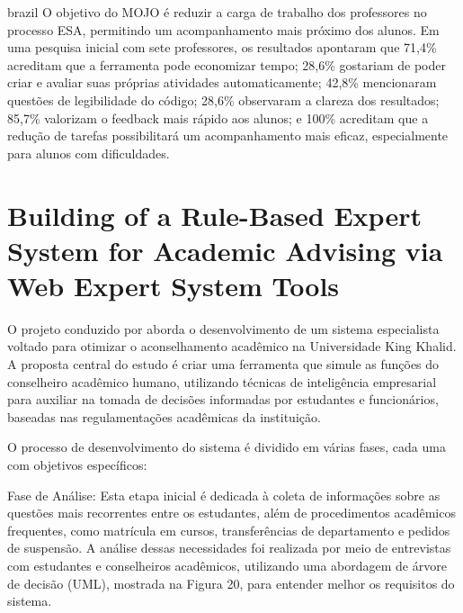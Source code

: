 \begin{otherlanguage*}{brazil}
O objetivo do MOJO é reduzir a carga de trabalho dos professores no processo ESA, permitindo um acompanhamento mais próximo dos alunos. Em uma pesquisa inicial com sete professores, os resultados apontaram que 71,4\% acreditam que a ferramenta pode economizar tempo; 28,6\% gostariam de poder criar e avaliar suas próprias atividades automaticamente; 42,8\% mencionaram questões de legibilidade do código; 28,6\% observaram a clareza dos resultados; 85,7\% valorizam o feedback mais rápido aos alunos; e 100\% acreditam que a redução de tarefas possibilitará um acompanhamento mais eficaz, especialmente para alunos com dificuldades.


\section{Building of a Rule-Based Expert System for Academic Advising via Web Expert System Tools}

O projeto conduzido por \textcite{osmannasr} aborda o desenvolvimento de um sistema especialista voltado para otimizar o aconselhamento acadêmico na Universidade King Khalid. A proposta central do estudo é criar uma ferramenta que simule as funções do conselheiro acadêmico humano, utilizando técnicas de inteligência empresarial para auxiliar na tomada de decisões informadas por estudantes e funcionários, baseadas nas regulamentações acadêmicas da instituição.

O processo de desenvolvimento do sistema é dividido em várias fases, cada uma com objetivos específicos:

Fase de Análise: Esta etapa inicial é dedicada à coleta de informações sobre as questões mais recorrentes entre os estudantes, além de procedimentos acadêmicos frequentes, como matrícula em cursos, transferências de departamento e pedidos de suspensão. A análise dessas necessidades foi realizada por meio de entrevistas com estudantes e conselheiros acadêmicos, utilizando uma abordagem de árvore de decisão (UML), mostrada na Figura 20, para entender melhor os requisitos do sistema.


\end{otherlanguage*}
